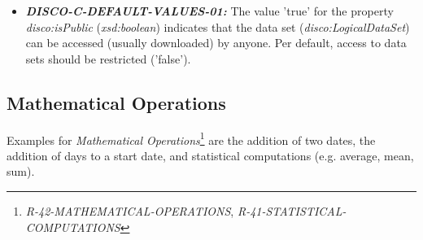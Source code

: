 \documentclass{llncs}
\begin{document}
\begin{itemize}
	\item \textbf{{\em DISCO-C-DEFAULT-VALUES-01:}}
The value 'true' for the property {\em disco:isPublic} ({\em xsd:boolean}) indicates that the data set ({\em disco:LogicalDataSet}) can be accessed (usually downloaded) by anyone.
Per default, access to data sets should be restricted ('false').
\end{itemize}

\subsection{Mathematical Operations}

Examples for {\em Mathematical Operations}\footnote{{\em R-42-MATHEMATICAL-OPERATIONS}, {\em R-41-STATISTICAL-COMPUTATIONS}} are the addition of two dates, the addition of days to a start date, and statistical computations (e.g. average, mean, sum).
\end{document}
